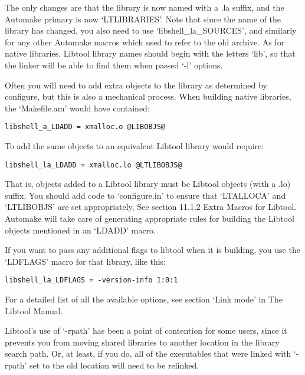 The only changes are that the library is now named with a .la suffix, and the Automake primary is now `LTLIBRARIES'. Note that since the name of the library has changed, you also need to use `libshell\_{}la\_{}SOURCES', and similarly for any other Automake macros which used to refer to the old archive. As for native libraries, Libtool library names should begin with the letters `lib', so that the linker will be able to find them when passed `-l' options. 


Often you will need to add extra objects to the library as determined by configure, but this is also a mechanical process. When building native libraries, the `Makefile.am' would have contained:

\begin{Verbatim}[frame=single]
libshell_a_LDADD = xmalloc.o @LIBOBJS@
\end{Verbatim}

 To add the same objects to an equivalent Libtool library would require: 
 

\begin{Verbatim}[frame=single]
libshell_la_LDADD = xmalloc.lo @LTLIBOBJS@
\end{Verbatim}



That is, objects added to a Libtool library must be Libtool objects
(with a .lo) suffix. You should add code to `configure.in' to ensure 
that `LTALLOCA' and `LTLIBOBJS' are set appropriately,
See section 11.1.2 Extra Macros for Libtool. Automake will take care of 
generating appropriate rules for building the Libtool objects mentioned in 
an `LDADD' macro. 


If you want to pass any additional flags to libtool when it is building, you use the `LDFLAGS' macro for that library, like this: 



 

\begin{Verbatim}[frame=single]
libshell_la_LDFLAGS = -version-info 1:0:1
\end{Verbatim}



 For a detailed list of all the available options, see section `Link mode' in The Libtool Manual. 

Libtool's use of `-rpath' has been a point of contention for some users, since it prevents you from moving shared libraries to another location in the library search path. Or, at least, if you do, all of the executables that were linked with `-rpath' set to the old location will need to be relinked. 

